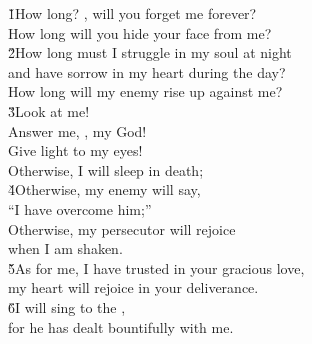 \begin{poetry}
\poeml \v{1}How long? , will you forget me forever? \\
\poemll    How long will you hide your face from me? \\
\poeml \v{2}How long must I struggle in my soul at night \\
\poemll    and have sorrow in my heart during the day? \\
\poemlll       How long will my enemy rise up against me? \\
\poeml \v{3}Look at me! \\
\poemll    Answer me, , my God! \\
\poeml Give light to my eyes! \\
\poemll    Otherwise, I will sleep in death; \\
\poeml \v{4}Otherwise, my enemy will say, \\
\poemll    ``I have overcome him;'' \\
\poeml Otherwise, my persecutor will rejoice \\
\poemll    when I am shaken. \\
\poeml \v{5}As for me, I have trusted in your gracious love, \\
\poemll    my heart will rejoice in your deliverance. \\
\poeml \v{6}I will sing to the , \\
\poemll    for he has dealt bountifully with me.
\end{poetry}

